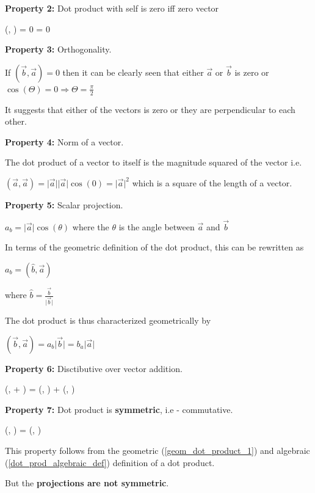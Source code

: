 \documentclass{article}
\begin{document}
\textbf{Property 2:} Dot product with self is zero iff zero vector

\beq \label{dot_prod_zero_if_zero}
(, ) = 0 \Leftrightarrow {} = 0
\eeq


\textbf{Property 3:} Orthogonality.

If $(\vec{b}, \vec{a}) = 0$ then it can be clearly seen that either $\vec{a}$ or $\vec{b}$ is zero or $\cos(\Theta) = 0 \Rightarrow \Theta = \frac{\pi}{2}$

It suggests that either of the vectors is zero or they are perpendicular to each other.

\textbf{Property 4:} Norm of a vector.

The dot product of a vector to itself is the magnitude squared of the vector i.e.

$(\vec{a}, \vec{a}) = \vert \vec{a} \vert \vert \vec{a} \vert \cos(0) = \vert \vec{a} \vert^2$ which is a square of the length of a vector.


\textbf{Property 5:} Scalar projection.

$a_{b} = \vert \vec{a} \vert \cos(\theta)$ where the $\theta$ is the angle between $\vec{a}$ and $\vec{b}$

In terms of the geometric definition of the dot product, this can be rewritten as

$a_{b} = (\hat{b}, \vec{a})$

where $\hat{b} = \frac{\vec{b}}{\vert \vec{b} \vert}$

The dot product is thus characterized geometrically by

$ (\vec{b}, \vec{a}) = a_{b} \vert \vec{b} \vert = b_{a} \vert \vec{a} \vert $

\textbf{Property 6:} Disctibutive over vector addition.

\beq \label{dot_prod_distributive}
(,  + ) = (, ) + (,  )
\eeq



\textbf{Property 7:} Dot product is \textbf{symmetric}, i.e - commutative.

\beq \label{dot_prod_symmetry}
(, ) = (, )
\eeq

This property follows from the geometric (\ref{geom_dot_product_1}) and algebraic (\ref{dot_prod_algebraic_def}) definition of a dot product.

But the \textbf{projections are not symmetric}.
\end{document}
